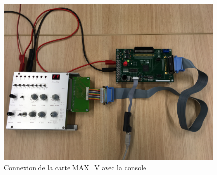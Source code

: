 \documentclass[nosolution]{exercice}
\begin{document}
\begin{figure}[H]
\begin{center}
\includegraphics[width=0.85\linewidth]{images/MAXV_branchement.JPG}
\caption{\label{fig_connexion}Connexion de la carte MAX\_V avec la console}
\end{center}
\end{figure}
\end{document}
